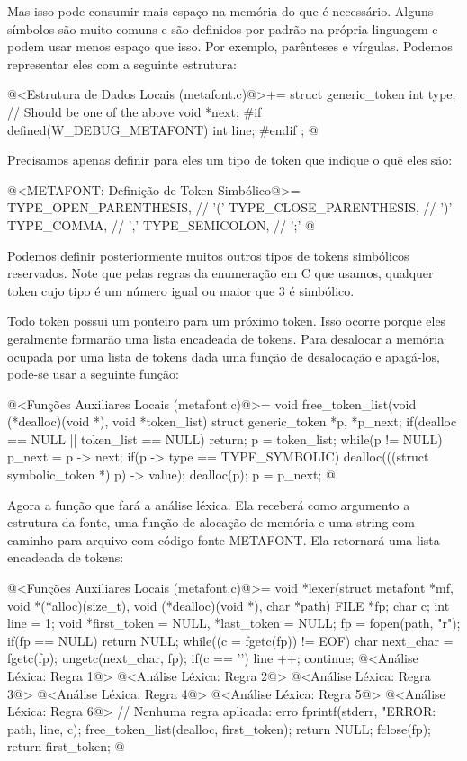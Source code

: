 Mas isso pode consumir mais espaço na memória do que é
necessário. Alguns símbolos são muito comuns e são definidos por
padrão na própria linguagem e podem usar menos espaço que isso. Por
exemplo, parênteses e vírgulas. Podemos representar eles com a
seguinte estrutura:

\iniciocodigo
@<Estrutura de Dados Locais (metafont.c)@>+=
struct generic_token{
  int type;   // Should be one of the above
  void *next;
#if defined(W_DEBUG_METAFONT)
  int line;
#endif
};
@
\fimcodigo

Precisamos apenas definir para eles um tipo de token que indique o quê
eles são:

\iniciocodigo
@<METAFONT: Definição de Token Simbólico@>=
TYPE_OPEN_PARENTHESIS,  // '('
TYPE_CLOSE_PARENTHESIS, // ')'
TYPE_COMMA,             // ','
TYPE_SEMICOLON,         // ';'
@
\fimcodigo

Podemos definir posteriormente muitos outros tipos de tokens
simbólicos reservados. Note que pelas regras da enumeração em C que
usamos, qualquer token cujo tipo é um número igual ou maior que 3 é
simbólico.

Todo token possui um ponteiro para um próximo token. Isso ocorre
porque eles geralmente formarão uma lista encadeada de tokens. Para
desalocar a memória ocupada por uma lista de tokens dada uma função de
desalocação e apagá-los, pode-se usar a seguinte função:

\iniciocodigo
@<Funções Auxiliares Locais (metafont.c)@>=
void free_token_list(void (*dealloc)(void *), void *token_list){
  struct generic_token *p, *p_next;
  if(dealloc == NULL || token_list == NULL)
    return;
  p = token_list;
  while(p != NULL){
    p_next = p -> next;
    if(p -> type == TYPE_SYMBOLIC)
      dealloc(((struct symbolic_token *) p) -> value);
    dealloc(p);
    p = p_next;
  }
}
@
\fimcodigo

Agora a função que fará a análise léxica. Ela receberá como argumento
a estrutura da fonte, uma função de alocação de memória e uma string
com caminho para arquivo com código-fonte METAFONT. Ela retornará uma
lista encadeada de tokens:

\iniciocodigo
@<Funções Auxiliares Locais (metafont.c)@>=
void *lexer(struct metafont *mf, void *(*alloc)(size_t),
            void (*dealloc)(void *), char *path){
  FILE *fp;
  char c;
  int line = 1;
  void *first_token = NULL, *last_token = NULL;
  fp = fopen(path, "r");
  if(fp == NULL)
    return NULL;
  while((c = fgetc(fp)) != EOF){
    char next_char = fgetc(fp);
    ungetc(next_char, fp);
    if(c == '\n'){
      line ++;
      continue;
    }
    @<Análise Léxica: Regra 1@>
    @<Análise Léxica: Regra 2@>
    @<Análise Léxica: Regra 3@>
    @<Análise Léxica: Regra 4@>
    @<Análise Léxica: Regra 5@>
    @<Análise Léxica: Regra 6@>
    // Nenhuma regra aplicada: erro
    fprintf(stderr, "ERROR: %
            path, line, c);
    free_token_list(dealloc, first_token);
    return NULL;
  }
  fclose(fp);
  return first_token;
}
@
\fimcodigo

